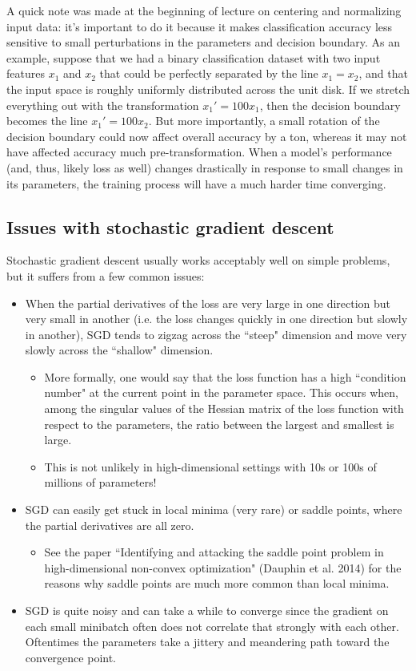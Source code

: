 A quick note was made at the beginning of lecture on centering and normalizing input data: it's important to do it because it makes classification accuracy less sensitive to small perturbations in the parameters and decision boundary. As an example, suppose that we had a binary classification dataset with two input features $x_1$ and $x_2$ that could be perfectly separated by the line $x_1 = x_2$, and that the input space is roughly uniformly distributed across the unit disk. If we stretch everything out with the transformation $x_1' = 100x_1$, then the decision boundary becomes the line $x_1' = 100x_2$. But more importantly, a small rotation of the decision boundary could now affect overall accuracy by a ton, whereas it may not have affected accuracy much pre-transformation. When a model's performance (and, thus, likely loss as well) changes drastically in response to small changes in its parameters, the training process will have a much harder time converging.

\subsection{Issues with stochastic gradient descent}
Stochastic gradient descent usually works acceptably well on simple problems, but it suffers from a few common issues:
\begin{itemize}
\item When the partial derivatives of the loss are very large in one direction but very small in another (i.e. the loss changes quickly in one direction but slowly in another), SGD tends to zigzag across the ``steep" dimension and move very slowly across the ``shallow" dimension.
\begin{itemize}
\item More formally, one would say that the loss function has a high ``condition number" at the current point in the parameter space. This occurs when, among the singular values of the Hessian matrix of the loss function with respect to the parameters, the ratio between the largest and smallest is large.
\item This is not unlikely in high-dimensional settings with 10s or 100s of millions of parameters!
\end{itemize}
\item SGD can easily get stuck in local minima (very rare) or saddle points, where the partial derivatives are all zero.
\begin{itemize}
\item See the paper ``Identifying and attacking the saddle point problem in high-dimensional non-convex optimization" (Dauphin et al. 2014) for the reasons why saddle points are much more common than local minima.
\end{itemize}
\item SGD is quite noisy and can take a while to converge since the gradient on each small minibatch often does not correlate that strongly with each other. Oftentimes the parameters take a jittery and meandering path toward the convergence point.
\end{itemize}

